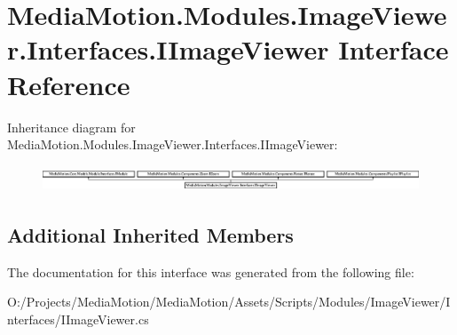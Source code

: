\hypertarget{interface_media_motion_1_1_modules_1_1_image_viewer_1_1_interfaces_1_1_i_image_viewer}{\section{Media\+Motion.\+Modules.\+Image\+Viewer.\+Interfaces.\+I\+Image\+Viewer Interface Reference}
\label{interface_media_motion_1_1_modules_1_1_image_viewer_1_1_interfaces_1_1_i_image_viewer}
}
Inheritance diagram for Media\+Motion.\+Modules.\+Image\+Viewer.\+Interfaces.\+I\+Image\+Viewer\+:\begin{figure}[H]
\begin{center}
\leavevmode
\includegraphics[height=0.773481cm]{interface_media_motion_1_1_modules_1_1_image_viewer_1_1_interfaces_1_1_i_image_viewer}
\end{center}
\end{figure}
\subsection*{Additional Inherited Members}


The documentation for this interface was generated from the following file\+:\begin{DoxyCompactItemize}
\item 
O\+:/\+Projects/\+Media\+Motion/\+Media\+Motion/\+Assets/\+Scripts/\+Modules/\+Image\+Viewer/\+Interfaces/I\+Image\+Viewer.\+cs\end{DoxyCompactItemize}
